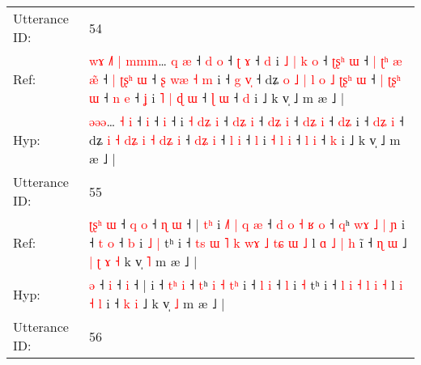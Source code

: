 \documentclass[10pt]{article}
\DeclareRobustCommand{\hl}[1]{{\textcolor{red}{#1}}}
\begin{document}
\begin{longtable}{ll}
 \\
\midrule
Utterance ID: & 54 \\
Ref: & \hl{w}\hl{ɤ}\hl{ }\hl{˩}\hl{˥}\hl{ }\hl{|}\hl{ }\hl{m}\hl{m}\hl{m}… \hl{q} \hl{æ} ˧\hl{ }\hl{d} \hl{o} ˧\hl{ }\hl{ʈ} \hl{ɤ} ˧\hl{ }\hl{d} i \hl{˩} \hl{|}\hl{ }\hl{k} \hl{o} ˧ \hl{ʈ}\hl{ʂ}\hl{ʰ} \hl{ɯ} ˧\hl{ }\hl{|} \hl{ʈ}\hl{ʰ}\hl{ }\hl{æ} \hl{æ}\hl{̃} ˧\hl{ }\hl{|} \hl{ʈ}\hl{ʂ}\hl{ʰ} \hl{ɯ} ˧\hl{ }\hl{ʂ}\hl{ }\hl{w}\hl{æ} \hl{˧}\hl{ }\hl{m} i ˧ \hl{g}\hl{ }\hl{v}\hl{̩} ˧ dʑ \hl{o} \hl{˩} \hl{|}\hl{ }\hl{l} \hl{o} \hl{˩} \hl{ʈ}\hl{ʂ}\hl{ʰ} \hl{ɯ} ˧\hl{ }\hl{|} \hl{ʈ}\hl{ʂ}\hl{ʰ} \hl{ɯ} ˧ \hl{n} \hl{e} ˧ \hl{ʝ} i\hl{ }\hl{˥} \hl{|} \hl{ɖ} \hl{ɯ} ˧ \hl{ɭ} \hl{ɯ} ˧ \hl{d} i ˩ k v̩ ˩ m æ ˩ |
 \\
Hyp: & \hl{}\hl{}\hl{}\hl{}\hl{}\hl{}\hl{}\hl{}\hl{ə}\hl{ə}\hl{ə}… \hl{˧} \hl{i} ˧\hl{}\hl{} \hl{i} ˧\hl{}\hl{} \hl{i} ˧\hl{}\hl{} i \hl{˧} \hl{}\hl{d}\hl{ʑ} \hl{i} ˧ \hl{}\hl{d}\hl{ʑ} \hl{i} ˧\hl{}\hl{} \hl{}\hl{}\hl{d}\hl{ʑ} \hl{}\hl{i} ˧\hl{}\hl{} \hl{}\hl{d}\hl{ʑ} \hl{i} ˧\hl{}\hl{}\hl{}\hl{}\hl{} \hl{}\hl{d}\hl{ʑ} i ˧ \hl{d}\hl{ʑ}\hl{ }\hl{i} ˧ dʑ \hl{i} \hl{˧} \hl{}\hl{d}\hl{ʑ} \hl{i} \hl{˧} \hl{}\hl{d}\hl{ʑ} \hl{i} ˧\hl{}\hl{} \hl{}\hl{d}\hl{ʑ} \hl{i} ˧ \hl{l} \hl{i} ˧ \hl{l} i\hl{}\hl{} \hl{˧} \hl{l} \hl{i} ˧ \hl{l} \hl{i} ˧ \hl{k} i ˩ k v̩ ˩ m æ ˩ |
 \\
\midrule
Utterance ID: & 55 \\
Ref: & \hl{ʈ}\hl{ʂ}\hl{ʰ}\hl{ }\hl{ɯ} ˧\hl{ }\hl{q} \hl{o} ˧\hl{ }\hl{ɳ} \hl{ɯ} ˧ |\hl{ }\hl{t}\hl{ʰ} i\hl{ }\hl{˩}\hl{˥}\hl{ }\hl{|}\hl{ }\hl{q}\hl{ }\hl{æ} ˧\hl{ }\hl{d}\hl{ }\hl{o} \hl{˧}\hl{ }\hl{ʁ} \hl{o} ˧ \hl{q}ʰ \hl{w}\hl{ɤ} \hl{˩} \hl{|}\hl{ }\hl{ɲ} i ˧ \hl{t} \hl{o} ˧ \hl{b} i\hl{ }\hl{˩} \hl{|} tʰ i ˧\hl{ }\hl{t}\hl{s}\hl{ }\hl{ɯ}\hl{ }\hl{˥} \hl{k} \hl{w}\hl{ɤ} \hl{˩} \hl{t}\hl{ɕ} \hl{ɯ} \hl{˩} l\hl{ }\hl{ɑ} \hl{˩} \hl{|} \hl{h} i\hl{̃} ˧ \hl{ɳ} \hl{ɯ} ˩\hl{ }\hl{|}\hl{ }\hl{ʈ}\hl{ }\hl{ɤ}\hl{ }\hl{˧} k v̩ \hl{˥} m æ ˩ |
 \\
Hyp: & \hl{}\hl{}\hl{}\hl{}\hl{ə} ˧\hl{}\hl{} \hl{i} ˧\hl{}\hl{} \hl{i} ˧ |\hl{}\hl{}\hl{} i\hl{}\hl{}\hl{}\hl{}\hl{}\hl{}\hl{}\hl{}\hl{} ˧\hl{}\hl{}\hl{}\hl{} \hl{}\hl{t}\hl{ʰ} \hl{i} ˧ \hl{t}ʰ \hl{}\hl{i} \hl{˧} \hl{}\hl{t}\hl{ʰ} i ˧ \hl{l} \hl{i} ˧ \hl{l} i\hl{}\hl{} \hl{˧} tʰ i ˧\hl{}\hl{}\hl{}\hl{}\hl{}\hl{}\hl{} \hl{l} \hl{}\hl{i} \hl{˧} \hl{}\hl{l} \hl{i} \hl{˧} l\hl{}\hl{} \hl{i} \hl{˧} \hl{l} i\hl{} ˧ \hl{k} \hl{i} ˩\hl{}\hl{}\hl{}\hl{}\hl{}\hl{}\hl{}\hl{} k v̩ \hl{˩} m æ ˩ |
 \\
\midrule
Utterance ID: & 56 \\

\end{longtable}
\end{document}
